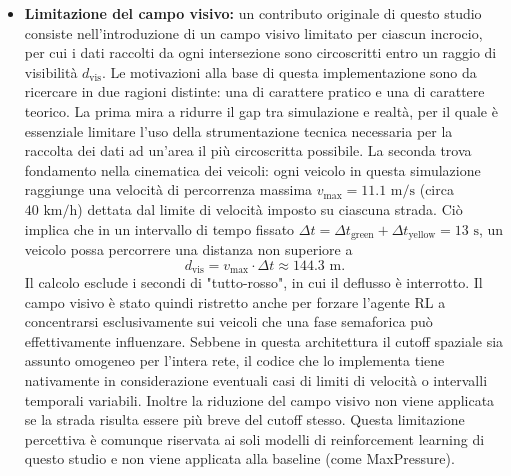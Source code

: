 \begin{itemize}
  \item \textbf{Limitazione del campo visivo:} un contributo originale di questo studio consiste nell'introduzione di un campo visivo limitato per ciascun incrocio, per cui i dati raccolti da ogni intersezione sono circoscritti entro un raggio di visibilità $d_{\text{vis}}$.
        Le motivazioni alla base di questa implementazione sono da ricercare in due ragioni distinte: una di carattere pratico e una di carattere teorico.
        La prima mira a ridurre il gap tra simulazione e realtà, per il quale è essenziale limitare l'uso della strumentazione tecnica necessaria per la raccolta dei dati ad un'area il più circoscritta possibile.
        La seconda trova fondamento nella cinematica dei veicoli: ogni veicolo in questa simulazione raggiunge una velocità di percorrenza massima $v_{\mathrm{max}} = 11.1 \text{ m/s}$ (circa $40 \text{ km/h}$) dettata dal limite di velocità imposto su ciascuna strada.
        Ciò implica che in un intervallo di tempo fissato $\Delta t = \Delta t_{\text{green}} + \Delta t_{\text{yellow}} = 13 \text{ s}$, un veicolo possa percorrere una distanza non superiore a
        \[d_{\text{vis}} = v_{\mathrm{max}} \cdot \Delta t \approx 144.3 \text{ m} .\] Il calcolo esclude i secondi di "tutto-rosso", in cui il deflusso è interrotto.
        Il campo visivo è stato quindi ristretto anche per forzare l'agente RL a concentrarsi esclusivamente sui veicoli che una fase semaforica può effettivamente influenzare.
        Sebbene in questa architettura il cutoff spaziale sia assunto omogeneo per l'intera rete, il codice che lo implementa tiene nativamente in considerazione
        eventuali casi di limiti di velocità o intervalli temporali variabili.
        Inoltre la riduzione del campo visivo non viene applicata se la strada risulta essere più breve del cutoff stesso.
        Questa limitazione percettiva è comunque riservata ai soli modelli di reinforcement learning di questo studio e non viene applicata alla baseline (come MaxPressure).


\end{itemize}
